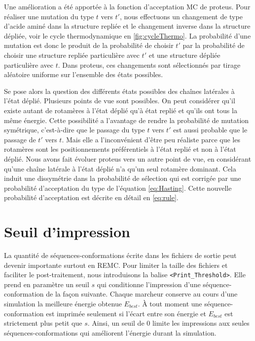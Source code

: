 Une amélioration a été apportée à la fonction d'acceptation MC de proteus. Pour réaliser une mutation du type $t$ vers $t'$, nous effectuons un changement de type d'acide aminé dans la structure repliée et le changement inverse dans la structure dépliée, voir le cycle thermodynamique en \vref{fig:cycleThermo}. La probabilité d'une mutation est donc le produit de la probabilité de choisir $t'$ par la probabilité de choisir une structure repliée particulière avec $t'$ et une structure dépliée particulière avec $t$. Dans proteus, ces changements sont sélectionnés par tirage aléatoire uniforme sur l'ensemble des états possibles. 

Se pose alors la question des différents états possibles des chaînes latérales à l'état déplié. Plusieurs points de vue sont possibles. On peut considérer qu'il existe autant de rotamères à l'état déplié qu'à état replié et qu'ils ont tous la même énergie. Cette possibilité a l'avantage de rendre la probabilité de mutation symétrique, c'est-à-dire que le passage du type $t$ vers $t'$ est aussi probable que le passage de $t'$ vers $t$. Mais elle a l'inconvénient d'être peu réaliste parce que les rotamères sont les positionnements préférentiels à l'état replié et non à l'état déplié. Nous avons fait évoluer proteus vers un autre point de vue, en considérant qu'une chaîne latérale à l'état déplié n'a qu'un seul rotamère dominant. Cela induit une dissymétrie dans la probabilité de sélection qui est corrigée par une probabilité d'acceptation du type de l'équation \ref{eq:Hasting}. Cette nouvelle probabilité d'acceptation est décrite en détail en \vref{eq:rule}.

\section{Seuil d'impression}
\label{sec:dev}
La quantité de séquences-conformations écrite dans les fichiers de sortie peut devenir importante surtout en REMC. Pour limiter la taille des fichiers et faciliter le post-traitement, nous introduisons la balise \verb!<Print_Threshold>!. Elle prend en paramètre un seuil $s$ qui conditionne l'impression d'une séquence-conformation de la façon suivante. Chaque marcheur conserve au cours d'une simulation la meilleure énergie obtenue $E_{best}$. À tout moment une séquence-conformation est imprimée seulement si l'écart entre son énergie et $E_{best}$  est strictement plus petit que $s$. Ainsi, un seuil de $0$ limite les impressions aux seules séquences-conformations qui améliorent l'énergie durant la simulation.

